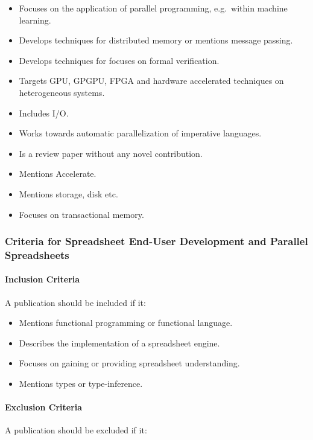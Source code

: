 \documentclass[a4paper]{article}
\begin{document}
\begin{itemize}
\item Focuses on the application of parallel programming, e.g.\ within
  machine learning.
\item Develops techniques for distributed memory or mentions message
  passing.
\item Develops techniques for focuses on formal verification.
\item Targets GPU, GPGPU, FPGA and hardware accelerated techniques on
  heterogeneous systems.
\item Includes I/O.
\item Works towards automatic parallelization of imperative languages.
\item Is a review paper without any novel contribution.
\item Mentions Accelerate.
\item Mentions storage, disk etc.
\item Focuses on transactional memory.
\end{itemize}

\subsubsection{Criteria for Spreadsheet End-User Development and
  Parallel Spreadsheets}
\label{sec:crit-spre-end}

\paragraph{Inclusion Criteria}

A publication should be included if it:

\begin{itemize}
\item Mentions functional programming or functional language.
\item Describes the implementation of a spreadsheet engine.
\item Focuses on gaining or providing spreadsheet understanding.
\item Mentions types or type-inference.
\end{itemize}

\paragraph{Exclusion Criteria}

A publication should be excluded if it:
\end{document}
